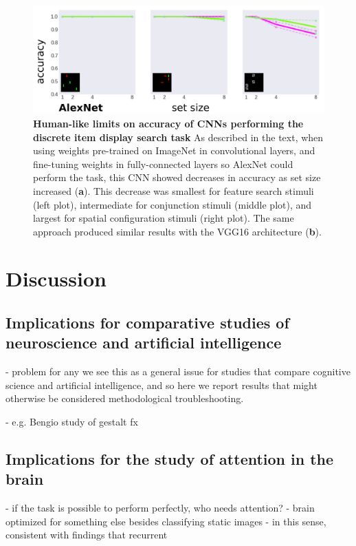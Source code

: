 \documentclass[10pt,letterpaper]{article}
\begin{document}
\begin{figure}[!ht]
\begin{center}
\includegraphics[width=\columnwidth]{fig4/fig4.png}
\end{center}
\caption{
\textbf{Human-like limits on accuracy of CNNs performing the discrete item display search task}
As described in the text, when using weights pre-trained on ImageNet in convolutional layers, 
and fine-tuning weights in fully-connected layers so AlexNet could perform the task, 
this CNN showed decreases in accuracy as set size increased (\textbf{a}). This decrease was 
smallest for feature search stimuli (left plot), intermediate for conjunction stimuli (middle plot), 
and largest for spatial configuration stimuli (right plot). The same approach produced similar 
results with the VGG16 architecture (\textbf{b}).
} 
\label{fig2}
\end{figure}

\section{Discussion}

\subsection{Implications for comparative studies of neuroscience and 
artificial intelligence}
- problem for any 
we see this as a general issue 
for studies that compare cognitive science and artificial intelligence, and 
so here we report results that might otherwise be considered methodological 
troubleshooting.

- e.g. Bengio study of gestalt fx

\subsection{Implications for the study of attention in the brain}
- if the task is possible to perform perfectly, who needs attention?
- brain optimized for something else besides classifying static images
- in this sense, consistent with findings that recurrent
\end{document}
